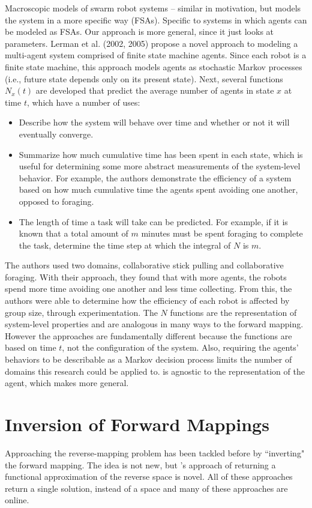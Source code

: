 Macroscopic models of swarm robot systems \cite{lerman2002mmf}\cite{lerman2005rpm} -- similar in motivation, but models the system in a more specific way (FSAs). Specific to systems in which agents can be modeled as FSAs. Our approach is more general, since it just looks at parameters.
Lerman et al. (2002, 2005) propose a novel approach to modeling a multi-agent system comprised of finite state machine agents.
Since each robot is a finite state machine, this approach models agents as stochastic Markov processes (i.e., future state depends only on its present state).
Next, several functions $N_x(t)$ are developed that predict the average number of agents in state $x$ at time $t$, which have a number of uses:
\begin{itemize}
\item Describe how the system will behave over time and whether or not it will eventually converge.
\item Summarize how much cumulative time has been spent in each state, which is useful for determining some more abstract measurements of the system-level behavior. For example, the authors demonstrate the efficiency of a system based on how much cumulative time the agents spent avoiding one another, opposed to foraging.
\item The length of time a task will take can be predicted. For example, if it is known that a total amount of $m$ minutes must be spent foraging to complete the task, determine the time step at which the integral of $N$ is $m$.
\end{itemize}
The authors used two domains, collaborative stick pulling and collaborative foraging.
With their approach, they found that with more agents, the robots spend more time avoiding one another and less time collecting.
From this, the authors were able to determine how the efficiency of each robot is affected by group size, through experimentation.
The $N$ functions are the representation of system-level properties and are analogous in many ways to the \fw forward mapping.
However the approaches are fundamentally different because the functions are based on time $t$, not the configuration of the system.
Also, requiring the agents' behaviors to be describable as a Markov decision process limits the number of domains this research could be applied to.
\fw is agnostic to the representation of the agent, which makes \fw more general.


\section{Inversion of Forward Mappings}
\label{sec:invfm}
Approaching the reverse-mapping problem has been tackled before by ``inverting" the forward mapping.
The idea is not new, but  \fw's approach of returning a functional approximation of the reverse space is novel.
All of these approaches return a single solution, instead of a space and many of these approaches are online.

